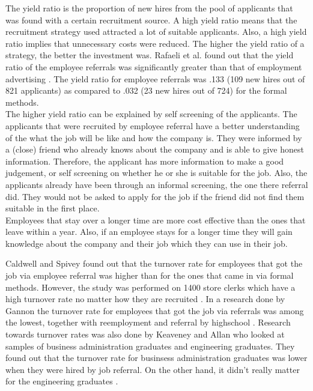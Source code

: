 \documentclass[Main.tex]{subfiles}
\begin{document}
The yield ratio is the proportion of new hires from the pool of applicants that was found with a certain recruitment source. A high yield ratio means that the recruitment strategy used attracted a lot of suitable applicants. Also, a high yield ratio implies that unnecessary costs were reduced. The higher the yield ratio of a strategy, the better the investment was. 
Rafaeli et al. found out that the yield ratio of the employee referrals was significantly greater than that of employment advertising \cite{fourth}. The yield ratio for employee referrals was .133 (109 new
hires out of 821 applicants) as compared to .032 (23 new hires out of 724) for the formal methods. \\

The higher yield ratio can be explained by self screening of the applicants. The applicants that were recruited by employee referral have a better understanding of the what the job will be like and how the company is. They were informed by a (close) friend who already knows about the company and is able to give honest information. Therefore, the applicant has more information to make a good judgement, or self screening on whether he or she is suitable for the job. Also, the applicants already have been through an informal screening, the one there referral did. They would not be asked to apply for the job if the friend did not find them suitable in the first place.  \\

Employees that stay over a longer time are more cost effective than the ones that leave within a year. Also, if an employee stays for a longer time they will gain knowledge about the company and their job which they can use in their job. 

Caldwell and Spivey found out that the turnover rate for employees that got the job via employee referral was higher than for the ones that came in via formal methods. However, the study was performed on 1400 store clerks which have a high turnover rate no matter how they are recruited \cite{second}. In a research done by Gannon the turnover rate for employees that got the job via referrals was among the lowest, together with reemployment and referral by highschool \cite{seventh}.
Research towards turnover rates was also done by Keaveney and Allan who looked at samples of business administration graduates and engineering graduates. They found out that the turnover rate for businsess administration graduates was lower when they were hired by job referral. On the other hand, it didn't really matter for the engineering graduates \cite{eleventh}. \\
\end{document}
